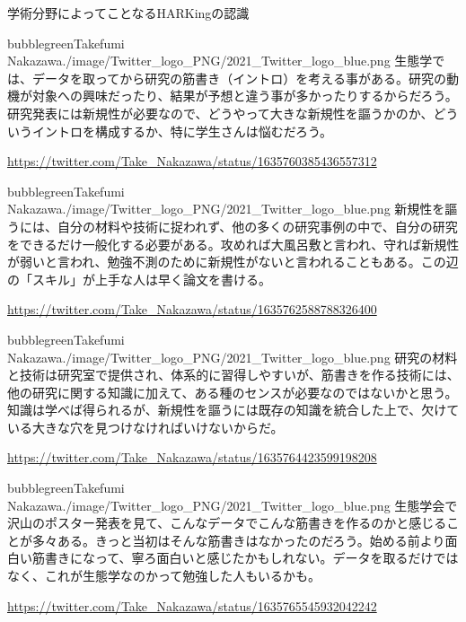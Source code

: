 \begin{SMbox}{学術分野によってことなるHARKingの認識}
    \begin{rightbubbles}{bubblegreen}{Takefumi Nakazawa}{./image/Twitter_logo_PNG/2021_Twitter_logo_blue.png}
        生態学では、データを取ってから研究の筋書き（イントロ）を考える事がある。研究の動機が対象への興味だったり、結果が予想と違う事が多かったりするからだろう。研究発表には新規性が必要なので、どうやって大きな新規性を謳うかのか、どういうイントロを構成するか、特に学生さんは悩むだろう。
        \begin{flushright} 
            \small	\url{https://twitter.com/Take_Nakazawa/status/1635760385436557312}
            \end{flushright}    
        \end{rightbubbles}

    \begin{rightbubbles}{bubblegreen}{Takefumi Nakazawa}{./image/Twitter_logo_PNG/2021_Twitter_logo_blue.png}
        新規性を謳うには、自分の材料や技術に捉われず、他の多くの研究事例の中で、自分の研究をできるだけ一般化する必要がある。攻めれば大風呂敷と言われ、守れば新規性が弱いと言われ、勉強不測のために新規性がないと言われることもある。この辺の「スキル」が上手な人は早く論文を書ける。
        \begin{flushright} 
            \small	\url{https://twitter.com/Take_Nakazawa/status/1635762588788326400}
            \end{flushright}    
        \end{rightbubbles}

        \begin{rightbubbles}{bubblegreen}{Takefumi Nakazawa}{./image/Twitter_logo_PNG/2021_Twitter_logo_blue.png}
            研究の材料と技術は研究室で提供され、体系的に習得しやすいが、筋書きを作る技術には、他の研究に関する知識に加えて、ある種のセンスが必要なのではないかと思う。知識は学べば得られるが、新規性を謳うには既存の知識を統合した上で、欠けている大きな穴を見つけなければいけないからだ。
            \begin{flushright} 
            \small	\url{https://twitter.com/Take_Nakazawa/status/1635764423599198208}
            \end{flushright}    
        \end{rightbubbles}

        \begin{rightbubbles}{bubblegreen}{Takefumi Nakazawa}{./image/Twitter_logo_PNG/2021_Twitter_logo_blue.png}
            生態学会で沢山のポスター発表を見て、こんなデータでこんな筋書きを作るのかと感じることが多々ある。きっと当初はそんな筋書きはなかったのだろう。始める前より面白い筋書きになって、寧ろ面白いと感じたかもしれない。データを取るだけではなく、これが生態学なのかって勉強した人もいるかも。
            \begin{flushright} 
            \small	\url{https://twitter.com/Take_Nakazawa/status/1635765545932042242}
            \end{flushright}    
        \end{rightbubbles}


\end{SMbox}

